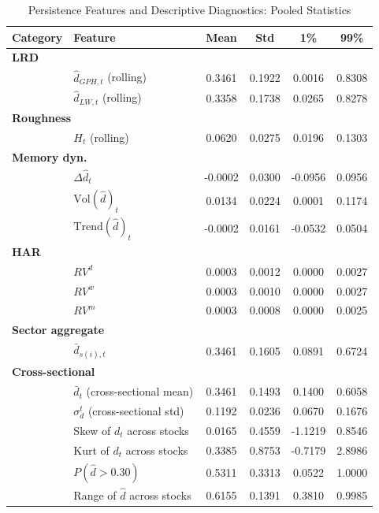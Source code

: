 
\begin{table}[htbp]
\centering
\caption{Persistence Features and Descriptive Diagnostics: Pooled Statistics}
\label{tab:features}
\small
\begin{tabular}{llcccc}
\toprule
Category & Feature & Mean & Std & 1\% & 99\% \\
\midrule
\multicolumn{6}{l}{\textbf{LRD}} \\
  & $\hat d_{GPH,t}$ (rolling) & 0.3461 & 0.1922 & 0.0016 & 0.8308 \\
  & $\hat d_{LW,t}$ (rolling) & 0.3358 & 0.1738 & 0.0265 & 0.8278 \\
\midrule
\multicolumn{6}{l}{\textbf{Roughness}} \\
  & $H_t$ (rolling) & 0.0620 & 0.0275 & 0.0196 & 0.1303 \\
\midrule
\multicolumn{6}{l}{\textbf{Memory dyn.}} \\
  & $\Delta\hat d_t$ & -0.0002 & 0.0300 & -0.0956 & 0.0956 \\
  & $\mathrm{Vol}(\hat d)_t$ & 0.0134 & 0.0224 & 0.0001 & 0.1174 \\
  & $\mathrm{Trend}(\hat d)_t$ & -0.0002 & 0.0161 & -0.0532 & 0.0504 \\
\midrule
\multicolumn{6}{l}{\textbf{HAR}} \\
  & $RV^d$ & 0.0003 & 0.0012 & 0.0000 & 0.0027 \\
  & $RV^w$ & 0.0003 & 0.0010 & 0.0000 & 0.0027 \\
  & $RV^m$ & 0.0003 & 0.0008 & 0.0000 & 0.0025 \\
\midrule
\multicolumn{6}{l}{\textbf{Sector aggregate}} \\
  & $\bar d_{s(i),t}$ & 0.3461 & 0.1605 & 0.0891 & 0.6724 \\
\midrule
\multicolumn{6}{l}{\textbf{Cross-sectional}} \\
  & $\bar d_t$ (cross-sectional mean) & 0.3461 & 0.1493 & 0.1400 & 0.6058 \\
  & $\sigma_d^t$ (cross-sectional std) & 0.1192 & 0.0236 & 0.0670 & 0.1676 \\
  & Skew of $d_t$ across stocks & 0.0165 & 0.4559 & -1.1219 & 0.8546 \\
  & Kurt of $d_t$ across stocks & 0.3385 & 0.8753 & -0.7179 & 2.8986 \\
  & $P(\hat d > 0.30)$ & 0.5311 & 0.3313 & 0.0522 & 1.0000 \\
  & Range of $\hat d$ across stocks & 0.6155 & 0.1391 & 0.3810 & 0.9985 \\

\end{tabular}
\end{table}
